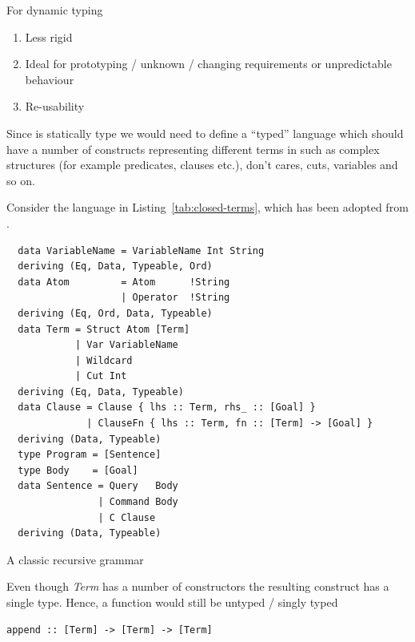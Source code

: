 \documentclass[thesis-solanki.tex]{subfiles}
\begin{document}
For dynamic typing
\begin{enumerate}
\item Less rigid
\item Ideal for prototyping / unknown / changing requirements or unpredictable behaviour
\item Re-usability
\end{enumerate}

Since  is statically type we would need to define a ``typed\yyy'' language which
should have a number of constructs representing different terms in  such as complex structures
(for example predicates, clauses etc.), don't cares, cuts, variables and so on.

Consider the language {in Listing~\ref{tab:closed-terms}}, which has been adopted from
\cite{prolog-lib}.

\begin{code-list}
\begin{verbatim}
  data VariableName = VariableName Int String
  deriving (Eq, Data, Typeable, Ord)
  data Atom         = Atom      !String
                    | Operator  !String
  deriving (Eq, Ord, Data, Typeable)
  data Term = Struct Atom [Term]
            | Var VariableName
            | Wildcard
            | Cut Int
  deriving (Eq, Data, Typeable)
  data Clause = Clause { lhs :: Term, rhs_ :: [Goal] }
              | ClauseFn { lhs :: Term, fn :: [Term] -> [Goal] }
  deriving (Data, Typeable)
  type Program = [Sentence]
  type Body    = [Goal]
  data Sentence = Query   Body
                | Command Body
                | C Clause
  deriving (Data, Typeable)
\end{verbatim}
  \caption{A classic recursive grammar}
  \label{tab:closed-terms}
\end{code-list}

Even though \textit{Term} has a number of constructors the resulting construct has a single type.
Hence, a function would still be untyped / singly typed
\par
\begin{verbatim}
append :: [Term] -> [Term] -> [Term]
\end{verbatim}

\end{document}

